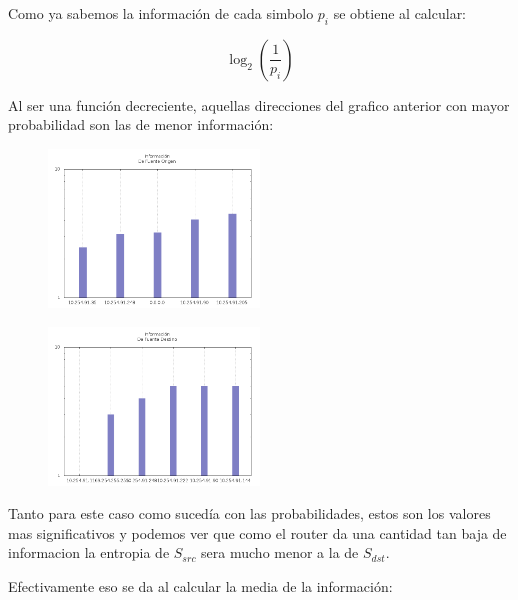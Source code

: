 	\par Como ya sabemos la información de cada simbolo $p_{i}$ se obtiene al calcular:

\begin{equation}
	\log_2 (\frac{1}{ p_{i} })
\end{equation}

	\par Al ser una función decreciente, aquellas direcciones del grafico anterior con mayor probabilidad son las de menor información:

\begin{figure}[!ht]
    \centering
    \includegraphics[width=0.5\textwidth]{img/graph/escenario_3/info_src.png}
\end{figure}


\begin{figure}[!ht]
    \centering
    \includegraphics[width=0.5\textwidth]{img/graph/escenario_3/info_dst.png}
\end{figure}

	\par Tanto para este caso como sucedía con las probabilidades, estos son los valores mas significativos y podemos ver que como el router da una cantidad tan baja de informacion la entropia de $S_{src}$ sera mucho menor a la de $S_{dst}$.

	\par Efectivamente eso se da al calcular la media de la información:
    
\vspace{6 mm}

